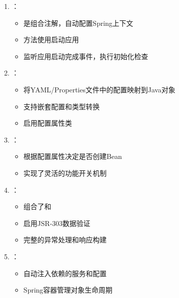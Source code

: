 \begin{enumerate}
\def\labelenumi{\arabic{enumi}.}
\tightlist
\item
  ：

  \begin{itemize}
  \tightlist
  \item
    是组合注解，自动配置Spring上下文
  \item
    方法使用启动应用
  \item
    监听应用启动完成事件，执行初始化检查
  \end{itemize}
\item
  ：

  \begin{itemize}
  \tightlist
  \item
    将YAML/Properties文件中的配置映射到Java对象
  \item
    支持嵌套配置和类型转换
  \item
    启用配置属性类
  \end{itemize}
\item
  ：

  \begin{itemize}
  \tightlist
  \item
    根据配置属性决定是否创建Bean
  \item
    实现了灵活的功能开关机制
  \end{itemize}
\item
  ：

  \begin{itemize}
  \tightlist
  \item
    组合了和
  \item
    启用JSR-303数据验证
  \item
    完整的异常处理和响应构建
  \end{itemize}
\item
  ：

  \begin{itemize}
  \tightlist
  \item
    自动注入依赖的服务和配置
  \item
    Spring容器管理对象生命周期
  \end{itemize}
\end{enumerate}

